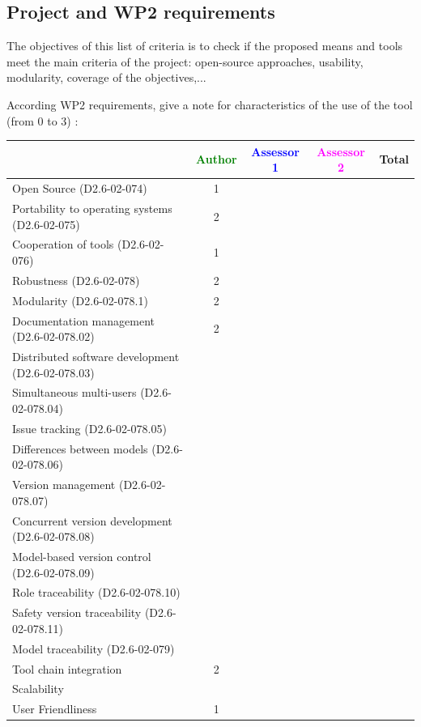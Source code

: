\subsection{Project and WP2 requirements}

The objectives of this list of criteria is to check if the proposed means and tools meet the main criteria of the project: open-source approaches, usability, modularity, coverage of the objectives,...

According WP2 requirements, give a note for characteristics of the use of the tool (from 0 to 3) :

\begin{tabular}{|l | c | c | c | c|}
\hline
& \textcolor{green}{Author} & \textcolor{blue}{Assessor 1} & \textcolor{magenta}{Assessor 2} & Total \\
\hline 
Open Source (D2.6-02-074) & 1 & & &  \\
\hline 
Portability to operating systems (D2.6-02-075) & 2 & & &  \\
\hline
Cooperation of tools (D2.6-02-076) & 1 & & &  \\
\hline
Robustness (D2.6-02-078) & 2 & & & \\
\hline
Modularity (D2.6-02-078.1) & 2 & & & \\
\hline
Documentation management (D2.6-02-078.02) & 2 & & & \\
\hline
Distributed software development (D2.6-02-078.03)  & & & & \\
\hline
Simultaneous multi-users (D2.6-02-078.04)   & & & & \\
\hline
Issue tracking (D2.6-02-078.05) & & & & \\
\hline
Differences between models (D2.6-02-078.06) & & & & \\
\hline
Version management (D2.6-02-078.07) & & & & \\
\hline
Concurrent version development (D2.6-02-078.08) & & & & \\
\hline
Model-based version control (D2.6-02-078.09) & & & & \\
\hline
Role traceability (D2.6-02-078.10) & & & & \\
\hline
Safety version traceability (D2.6-02-078.11) & & & & \\
\hline
Model traceability (D2.6-02-079) & & & & \\
\hline
Tool chain integration & 2 & & & \\
\hline
Scalability & & & & \\
\hline
User Friendliness & 1 & & & \\
\hline
\end{tabular}



